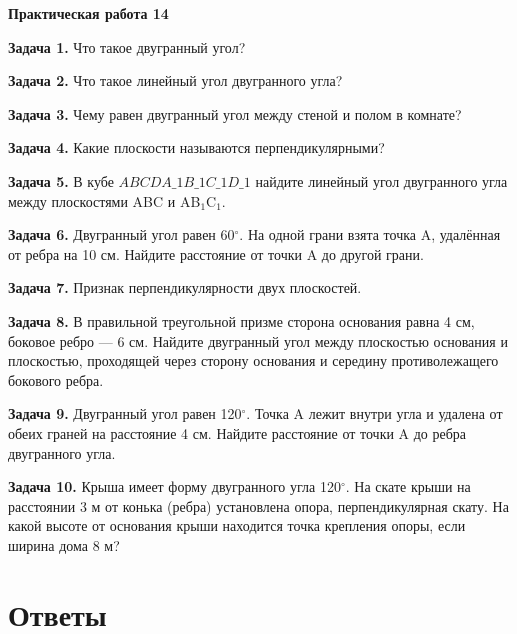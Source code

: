 \documentclass{umk-matematika}
\begin{document}
\begin{center}
{\Large\bfseries Практическая работа 14}
\end{center}
\vspace{0.5cm}

\textbf{Задача 1.} Что такое двугранный угол?\par\vspace{10pt}
\textbf{Задача 2.} Что такое линейный угол двугранного угла?\par\vspace{10pt}
\textbf{Задача 3.} Чему равен двугранный угол между стеной и полом в комнате?\par\vspace{10pt}
\textbf{Задача 4.} Какие плоскости называются перпендикулярными?\par\vspace{10pt}
\textbf{Задача 5.} В кубе $ABCDA\_1B\_1C\_1D\_1$ найдите линейный угол двугранного угла между плоскостями ABC и AB$_1$C$_1$.\par\vspace{10pt}
\textbf{Задача 6.} Двугранный угол равен 60$^\circ$. На одной грани взята точка A, удалённая от ребра на 10 см. Найдите расстояние от точки A до другой грани.\par\vspace{10pt}
\textbf{Задача 7.} Признак перпендикулярности двух плоскостей.\par\vspace{10pt}
\textbf{Задача 8.} В правильной треугольной призме сторона основания равна 4 см, боковое ребро — 6 см. Найдите двугранный угол между плоскостью основания и плоскостью, проходящей через сторону основания и середину противолежащего бокового ребра.\par\vspace{10pt}
\textbf{Задача 9.} Двугранный угол равен 120$^\circ$. Точка A лежит внутри угла и удалена от обеих граней на расстояние 4 см. Найдите расстояние от точки A до ребра двугранного угла.\par\vspace{10pt}
\textbf{Задача 10.} Крыша имеет форму двугранного угла 120$^\circ$. На скате крыши на расстоянии 3 м от конька (ребра) установлена опора, перпендикулярная скату. На какой высоте от основания крыши находится точка крепления опоры, если ширина дома 8 м?\par\vspace{10pt}
\newpage
\section*{Ответы}
\end{document}
